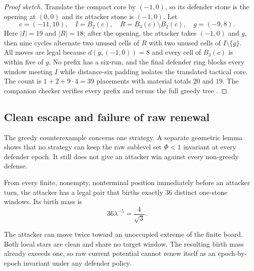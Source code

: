 \begin{proof}[Proof sketch]
Translate the compact core by $(-1,0)$, so its defender stone is the opening
at $(0,0)$ and its attacker stone is $(-1,0)$.  Let
\[
 c=(-11,10),\quad I=B_2(c),\quad
 R=B_3(c)\setminus B_2(c),\quad g=(-9,8).
\]
Here $|I|=19$ and $|R|=18$; after the opening, the attacker takes $(-1,0)$ and
$g$, then nine cycles alternate two unused cells of $R$ with two unused cells
of $I\setminus\{g\}$.
All moves are legal because $d(g,(-1,0))=8$ and every cell of $B_3(c)$ is
within five of $g$.
No prefix has a six-run, and the final defender ring blocks every window
meeting $I$ while distance-six padding isolates the translated tactical core.
The count is $1+2+9\cdot4=39$ placements with material totals $20$ and $19$.
The companion checker verifies every prefix and reruns the full greedy tree
\cite{hexobot-companions}.
\end{proof}

\subsection{Clean escape and failure of raw renewal}

The greedy counterexample concerns one strategy.  A separate geometric lemma
shows that no strategy can keep the raw sublevel set $\Phi<1$ invariant at
every defender epoch.  It still does not give an attacker win against every
non-greedy defense.

\begin{lemma}
\label{lem:ES-clean-escape}
From every finite, nonempty, nonterminal position immediately before an
attacker turn, the attacker has a legal pair that births exactly $36$ distinct
one-stone windows.  Its birth mass is
\[
 36\lambda^{-5}=\frac4{\sqrt3}.
\tag{10.19}
\]
\end{lemma}

\begin{plainterms}
The attacker can move twice toward an unoccupied extreme of the finite board.
Both local stars are clean and share no target window.  The resulting birth
mass already exceeds one, so raw current potential cannot renew itself as an
epoch-by-epoch invariant under any defender policy.
\end{plainterms}

